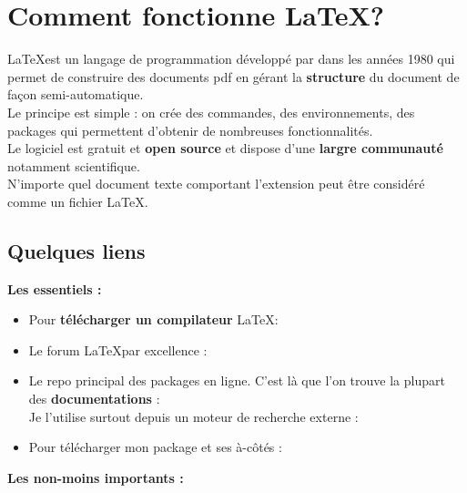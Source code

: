 \section{Comment fonctionne \LaTeX ?}

\LaTeX est un langage de programmation développé par  dans les années 1980 qui permet de construire des documents pdf en gérant la \textbf{structure} du document de façon semi-automatique.\\

Le principe est simple : on crée des commandes, des environnements, des packages qui permettent d'obtenir de nombreuses fonctionnalités.\\

Le logiciel est gratuit et \textbf{open source} et dispose d'une \textbf{largre communauté} notamment scientifique. \\

N'importe quel document texte comportant l'extension  peut être considéré comme un fichier \LaTeX. \\

\subsection{Quelques liens}

\textbf{Les essentiels :}\\
\begin{itemize}[label = \bccrayon]
	\item Pour \textbf{télécharger un compilateur} \LaTeX : 
	\item Le forum \LaTeX par excellence : 
	\item Le repo principal des packages en ligne. C'est là que l'on trouve la plupart des \textbf{documentations} : \\
		Je l'utilise surtout depuis un moteur de recherche externe : 
	\item Pour télécharger mon package  et ses à-côtés : 
\end{itemize}

\textbf{Les non-moins importants :}\\

